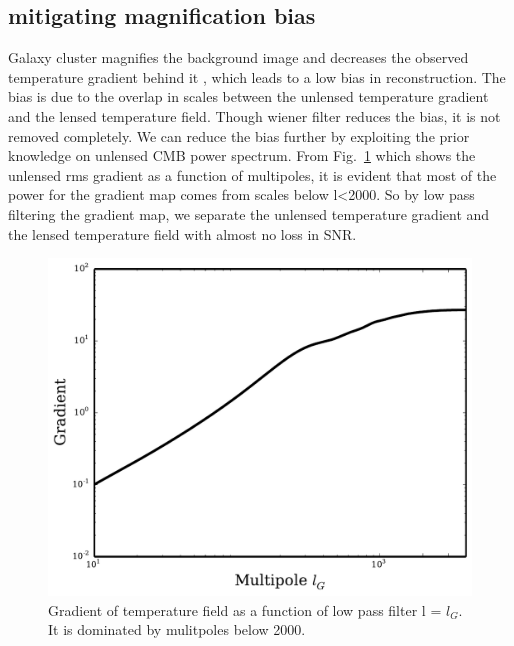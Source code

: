   \subsection{mitigating magnification bias}
Galaxy cluster magnifies the background image and decreases the observed temperature gradient behind it , which leads to a low bias in reconstruction.
The bias is due to the overlap in scales between the unlensed temperature gradient and the lensed temperature field. 
Though wiener filter reduces the bias, it is not removed completely.
We can reduce the bias further by exploiting the prior knowledge on unlensed CMB power spectrum.
 From Fig.~\ref{fig:gradient_cut} which shows the unlensed rms gradient as a function of multipoles, it is evident that most of the power for the gradient map comes from scales below l<2000.
 So by low pass filtering the gradient map, we separate the unlensed temperature gradient and the lensed temperature field with almost no loss in SNR.
 \begin{figure}
\includegraphics[width=\linewidth]{figs/gradient_cut.pdf}
\caption{Gradient of temperature field as a function of low pass filter l = $l_{G}$. It is dominated by mulitpoles below 2000. }
\label{fig:gradient_cut}
\end{figure}
